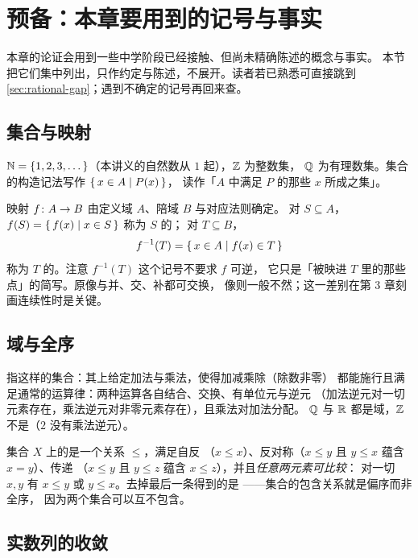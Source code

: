 \section{预备：本章要用到的记号与事实}
\label{sec:prelim}

本章的论证会用到一些中学阶段已经接触、但尚未精确陈述的概念与事实。
本节把它们集中列出，只作约定与陈述，不展开。读者若已熟悉可直接跳到%
\cref{sec:rational-gap}；遇到不确定的记号再回来查。

\subsection*{集合与映射}

\(\mathbb{N} = \left\{1,2,3,\dots\right\}\)（本讲义的自然数从 \(1\) 起），\(\mathbb{Z}\) 为整数集，
\(\mathbb{Q}\) 为有理数集。集合的构造记法写作 \(\left\{\,x \in A \;\middle|\; P(x)\,\right\}\)，
读作「\(A\) 中满足 \(P\) 的那些 \(x\) 所成之集」。

映射 \(f \colon A \to B\) 由定义域 \(A\)、陪域 \(B\) 与对应法则确定。
对 \(S \subseteq A\)，\(f(S) = \left\{\,f(x) \;\middle|\; x \in S\,\right\}\) 称为 \(S\) 的；
对 \(T \subseteq B\)，
\begin{equation}
  \label{eq:preimage}
  f^{-1}(T) = \left\{\,x \in A \;\middle|\; f(x) \in T\,\right\}
\end{equation}
称为 \(T\) 的。注意 \(f^{-1}(T)\) 这个记号不要求 \(f\) 可逆，
它只是「被映进 \(T\) 里的那些点」的简写。原像与并、交、补都可交换，
像则一般不然；这一差别在第 3 章刻画连续性时是关键。

\subsection*{域与全序}

指这样的集合：其上给定加法与乘法，使得加减乘除（除数非零）
都能施行且满足通常的运算律：两种运算各自结合、交换、有单位元与逆元
（加法逆元对一切元素存在，乘法逆元对非零元素存在），且乘法对加法分配。
\(\mathbb{Q}\) 与 \(\mathbb{R}\) 都是域，\(\mathbb{Z}\) 不是（\(2\) 没有乘法逆元）。

集合 \(X\) 上的是一个关系 \(\le\)，满足自反
（\(x \le x\)）、反对称（\(x \le y\) 且 \(y \le x\) 蕴含 \(x=y\)）、传递
（\(x \le y\) 且 \(y \le z\) 蕴含 \(x \le z\)），并且\emph{任意两元素可比较}：
对一切 \(x,y\) 有 \(x \le y\) 或 \(y \le x\)。去掉最后一条得到的是%
——集合的包含关系就是偏序而非全序，
因为两个集合可以互不包含。

\subsection*{实数列的收敛}

